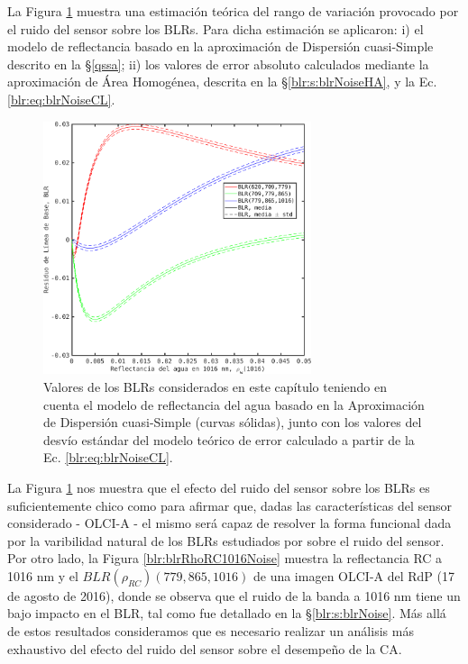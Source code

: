         La Figura \ref{blr:blrQssaNoise} muestra una estimación teórica del rango de variación provocado por el ruido del sensor sobre los BLRs. Para dicha estimación se aplicaron: i) el modelo de reflectancia basado en la aproximación de Dispersión cuasi-Simple descrito en la \S \ref{qssa}; ii) los valores de error absoluto calculados mediante la aproximación de Área Homogénea, descrita en la \S \ref{blr:s:blrNoiseHA}, y la Ec. \ref{blr:eq:blrNoiseCL}.
        
            \begin{figure}
            \centering
            \includegraphics[width=0.7\textwidth]{blr/figures/blrQssaNoise}
            \caption[Efecto del ruido sobre los BLRs, calculado a partir del método de Área Homogénea y del modelos qSSA de reflectancia del agua.]{Valores de los BLRs considerados en este capítulo teniendo en cuenta el modelo de reflectancia del agua basado en la Aproximación de Dispersión cuasi-Simple (curvas sólidas), junto con los valores del desvío estándar del modelo teórico de error calculado a partir de la Ec. \ref{blr:eq:blrNoiseCL}.}
            \label{blr:blrQssaNoise}
            \end{figure}

        La Figura \ref{blr:blrQssaNoise} nos muestra que el efecto del ruido del sensor sobre los BLRs es suficientemente chico como para afirmar que, dadas las características del sensor considerado - OLCI-A - el mismo será capaz de resolver la forma funcional dada por la varibilidad natural de los BLRs estudiados por sobre el ruido del sensor.
        Por otro lado, la Figura \ref{blr:blrRhoRC1016Noise} muestra la reflectancia RC a 1016 nm y el $BLR(\rho_{RC})(779,865,1016)$ de una imagen OLCI-A del RdP (17 de agosto de 2016), donde se observa que el ruido de la banda a 1016 nm tiene un bajo impacto en el BLR, tal como fue detallado en la \S \ref{blr:s:blrNoise}. Más allá de estos resultados consideramos que es necesario realizar un análisis más exhaustivo del efecto del ruido del sensor sobre el desempeño de la CA.
    
